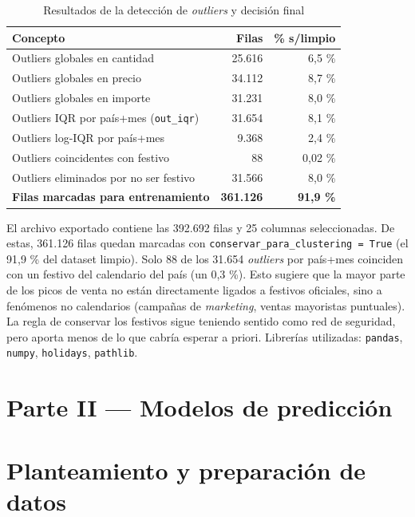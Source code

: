 \documentclass[11pt,a4paper]{article}
\begin{document}
\begin{table}[h]
\centering
\caption{Resultados de la detección de \textit{outliers} y decisión final}
\begin{tabular}{lrr}
\toprule
\textbf{Concepto} & \textbf{Filas} & \textbf{\% s/limpio} \\
\midrule
Outliers globales en cantidad & 25.616 & 6,5 \% \\
Outliers globales en precio & 34.112 & 8,7 \% \\
Outliers globales en importe & 31.231 & 8,0 \% \\
Outliers IQR por país+mes (\texttt{out\_iqr}) & 31.654 & 8,1 \% \\
Outliers log-IQR por país+mes & 9.368 & 2,4 \% \\
\midrule
Outliers coincidentes con festivo & 88 & 0,02 \% \\
Outliers eliminados por no ser festivo & 31.566 & 8,0 \% \\
\midrule
\textbf{Filas marcadas para entrenamiento} & \textbf{361.126} & \textbf{91,9 \%} \\
\bottomrule
\end{tabular}
\end{table}

El archivo exportado contiene las 392.692 filas y 25 columnas seleccionadas. De estas, 361.126 filas quedan marcadas con \texttt{conservar\_para\_clustering = True} (el 91,9 \% del dataset limpio). Solo 88 de los 31.654 \textit{outliers} por país+mes coinciden con un festivo del calendario del país (un 0,3 \%). Esto sugiere que la mayor parte de los picos de venta no están directamente ligados a festivos oficiales, sino a fenómenos no calendarios (campañas de \textit{marketing}, ventas mayoristas puntuales). La regla de conservar los festivos sigue teniendo sentido como red de seguridad, pero aporta menos de lo que cabría esperar a priori. Librerías utilizadas: \texttt{pandas}, \texttt{numpy}, \texttt{holidays}, \texttt{pathlib}.


\newpage
\section*{\textcolor{azultfm}{Parte II — Modelos de predicción}}

\section{Planteamiento y preparación de datos}
\end{document}

